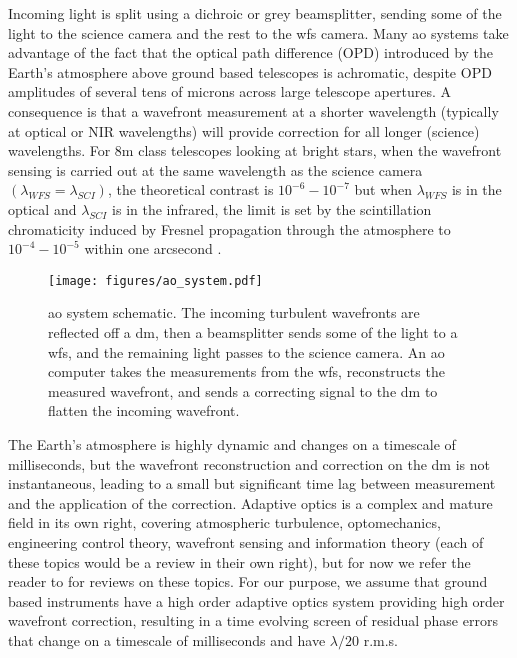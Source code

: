 \documentclass[letterpaper]{ar-1col}
\begin{document}
Incoming light is split using a dichroic or grey beamsplitter, sending some of the light to the science camera and the rest to the \ac{wfs} camera.
%
Many \ac{ao} systems take advantage of the fact that the optical path difference (OPD) introduced by the Earth's atmosphere above ground based telescopes is achromatic, despite OPD amplitudes of several tens of microns across large telescope apertures.
%
A consequence is that a wavefront measurement at a shorter wavelength (typically at optical or NIR wavelengths) will provide correction for all longer (science) wavelengths.
%
For 8m class telescopes looking at bright stars, when the wavefront sensing is carried out at the same wavelength as the science camera $(\lambda_{WFS}=\lambda_{SCI})$, the theoretical contrast is $10^{-6}-10^{-7}$ but when $\lambda_{WFS}$ is in the optical and $\lambda_{SCI}$ is in the infrared, the limit is set by the scintillation chromaticity induced by Fresnel propagation through the atmosphere to $10^{-4}-10^{-5}$ within one arcsecond \citep[see ][ for a discussion of this and the other limits to \ac{ao} for HCI]{Guyon05-1}.

\begin{figure}[!ht]
\centering
\texttt{[image: figures/ao\_system.pdf]}
 \caption{\ac{ao} system schematic. The incoming turbulent wavefronts are reflected off a \ac{dm}, then a beamsplitter sends some of the light to a \ac{wfs}, and the remaining light passes to the science camera. An \ac{ao} computer takes the measurements from the \ac{wfs}, reconstructs the measured wavefront, and sends a correcting signal to the \ac{dm} to flatten the incoming wavefront.}
  \label{fig:aosystem}
\end{figure}

The Earth's atmosphere is highly dynamic and changes on a timescale of milliseconds, but the wavefront reconstruction and correction on the \ac{dm} is not instantaneous, leading to a small but significant time lag between measurement and the application of the correction.
%
Adaptive optics is a complex and mature field in its own right, covering atmospheric turbulence, optomechanics, engineering control theory, wavefront sensing and information theory (each of these topics would be a review in their own right), but for now we refer the reader to \citet{Guyon18} for reviews on these topics. 
%
For our purpose, we assume that ground based instruments have a high order adaptive optics system providing high order wavefront correction, resulting in a time evolving screen of residual phase errors that change on a timescale of milliseconds and have $\lambda/20$ r.m.s.
\end{document}
